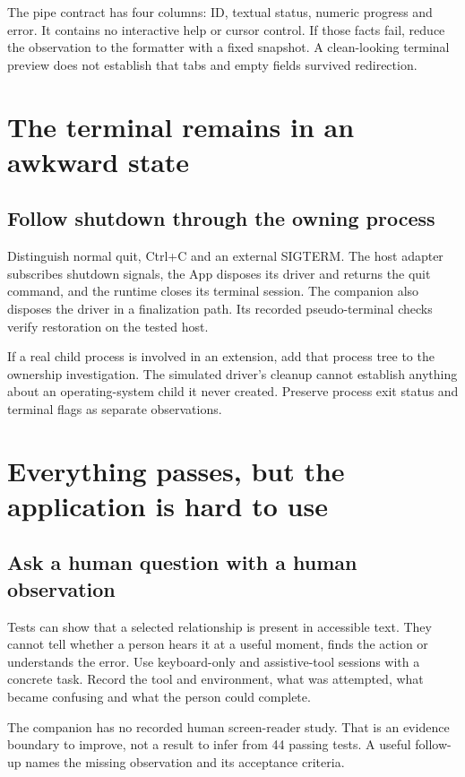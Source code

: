 The pipe contract has four columns: ID, textual status, numeric progress and error. It contains no interactive help or cursor control. If those facts fail, reduce the observation to the formatter with a fixed snapshot. A clean-looking terminal preview does not establish that tabs and empty fields survived redirection.

\section{The terminal remains in an awkward state}
\subsection{Follow shutdown through the owning process}

Distinguish normal quit, Ctrl+C and an external SIGTERM. The host adapter subscribes shutdown signals, the App disposes its driver and returns the quit command, and the runtime closes its terminal session. The companion also disposes the driver in a finalization path. Its recorded pseudo-terminal checks verify restoration on the tested host.

If a real child process is involved in an extension, add that process tree to the ownership investigation. The simulated driver's cleanup cannot establish anything about an operating-system child it never created. Preserve process exit status and terminal flags as separate observations.

\section{Everything passes, but the application is hard to use}
\subsection{Ask a human question with a human observation}

Tests can show that a selected relationship is present in accessible text. They cannot tell whether a person hears it at a useful moment, finds the action or understands the error. Use keyboard-only and assistive-tool sessions with a concrete task. Record the tool and environment, what was attempted, what became confusing and what the person could complete.

The companion has no recorded human screen-reader study. That is an evidence boundary to improve, not a result to infer from 44 passing tests. A useful follow-up names the missing observation and its acceptance criteria.

